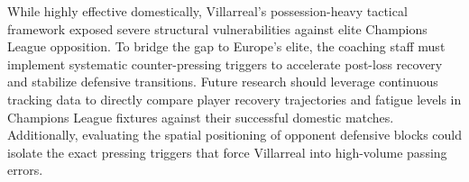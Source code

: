 \documentclass[a1paper,portrait,margin=20mm]{tikzposter}
\begin{document}
  	{
		While highly effective domestically, Villarreal’s possession-heavy tactical framework exposed severe structural vulnerabilities against elite Champions League opposition. To bridge the gap to Europe's elite, the coaching staff must implement systematic counter-pressing triggers to accelerate post-loss recovery and stabilize defensive transitions.
	}
	{
		Future research should leverage continuous tracking data to directly compare player recovery trajectories and fatigue levels in Champions League fixtures against their successful domestic matches. Additionally, evaluating the spatial positioning of opponent defensive blocks could isolate the exact pressing triggers that force Villarreal into high-volume passing errors.
	}



\end{document}
